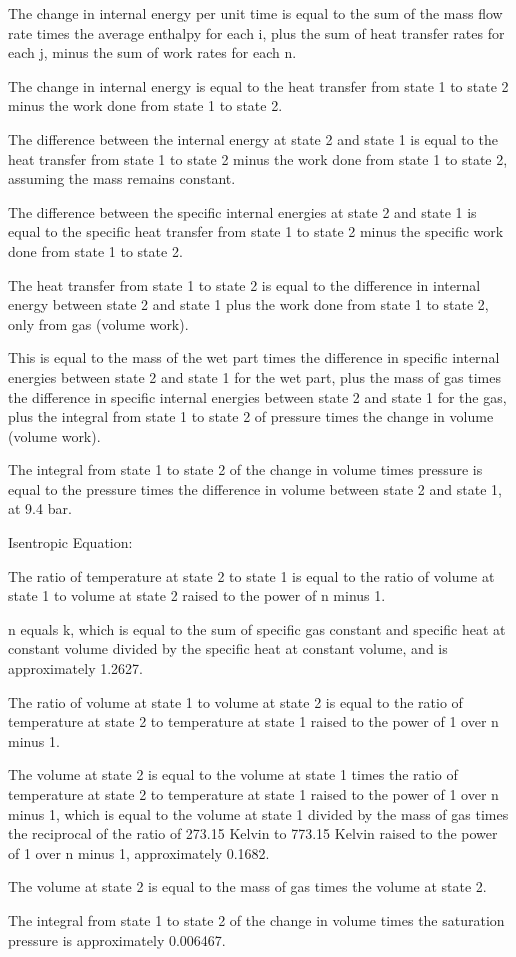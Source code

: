 The change in internal energy per unit time is equal to the sum of the mass flow rate times the average enthalpy for each i, plus the sum of heat transfer rates for each j, minus the sum of work rates for each n.

The change in internal energy is equal to the heat transfer from state 1 to state 2 minus the work done from state 1 to state 2.

The difference between the internal energy at state 2 and state 1 is equal to the heat transfer from state 1 to state 2 minus the work done from state 1 to state 2, assuming the mass remains constant.

The difference between the specific internal energies at state 2 and state 1 is equal to the specific heat transfer from state 1 to state 2 minus the specific work done from state 1 to state 2.

The heat transfer from state 1 to state 2 is equal to the difference in internal energy between state 2 and state 1 plus the work done from state 1 to state 2, only from gas (volume work).

This is equal to the mass of the wet part times the difference in specific internal energies between state 2 and state 1 for the wet part, plus the mass of gas times the difference in specific internal energies between state 2 and state 1 for the gas, plus the integral from state 1 to state 2 of pressure times the change in volume (volume work).

The integral from state 1 to state 2 of the change in volume times pressure is equal to the pressure times the difference in volume between state 2 and state 1, at 9.4 bar.

Isentropic Equation:

The ratio of temperature at state 2 to state 1 is equal to the ratio of volume at state 1 to volume at state 2 raised to the power of n minus 1.

n equals k, which is equal to the sum of specific gas constant and specific heat at constant volume divided by the specific heat at constant volume, and is approximately 1.2627.

The ratio of volume at state 1 to volume at state 2 is equal to the ratio of temperature at state 2 to temperature at state 1 raised to the power of 1 over n minus 1.

The volume at state 2 is equal to the volume at state 1 times the ratio of temperature at state 2 to temperature at state 1 raised to the power of 1 over n minus 1, which is equal to the volume at state 1 divided by the mass of gas times the reciprocal of the ratio of 273.15 Kelvin to 773.15 Kelvin raised to the power of 1 over n minus 1, approximately 0.1682.

The volume at state 2 is equal to the mass of gas times the volume at state 2.

The integral from state 1 to state 2 of the change in volume times the saturation pressure is approximately 0.006467.